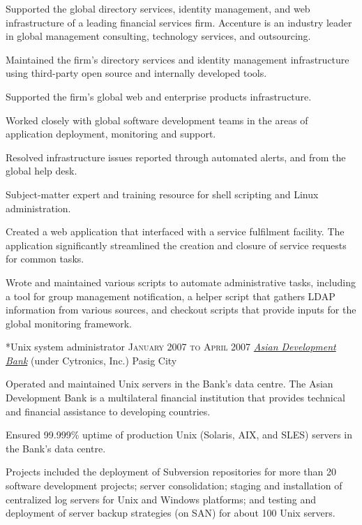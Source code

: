 \documentclass[10pt, a4paper, final]{article}
\begin{document}
\begin{section}
\begin{subsection}
    Supported the global directory services, identity management, and web infrastructure of a leading financial services firm. Accenture is an industry leader in global management consulting, technology services, and outsourcing.
    \vspace{1em}
    \begin{compactitem}
      \item Maintained the firm's directory services and identity management infrastructure using third-party open source and internally developed tools.
      \item Supported the firm's global web and enterprise products infrastructure.
      \item Worked closely with global software development teams in the areas of application deployment, monitoring and support.
      \item Resolved infrastructure issues reported through automated alerts, and from the global help desk.
      \item Subject-matter expert and training resource for shell scripting and Linux administration.
      \item Created a web application that interfaced with a service fulfilment facility. The application significantly streamlined the creation and closure of service requests for common tasks.
      \item Wrote and maintained various scripts to automate administrative tasks, including a tool for group management notification, a helper script that gathers LDAP information from various sources, and checkout scripts that provide inputs for the global monitoring framework.
      
    \end{compactitem}
  \end{subsection}
  \vspace{2.5em}

  \begin{subsection}*{Unix system administrator \hfill\textsc{January 2007 to April 2007}}
    \href{http://www.adb.org}{\textit{Asian Development Bank}} (under Cytronics, Inc.) \hfill Pasig City
    \vspace{1em}

    Operated and maintained Unix servers in the Bank's data centre. The Asian Development Bank is a multilateral financial institution that provides technical and financial assistance to developing countries.
    \vspace{1em}
    \begin{compactitem}
      \item Ensured 99.999\% uptime of production Unix (Solaris, AIX, and SLES) servers in the Bank's data centre.
      \item Projects included the deployment of Subversion repositories for more than 20 software development projects; server consolidation; staging and installation of centralized log servers for Unix and Windows platforms; and testing and deployment of server backup strategies (on SAN) for about 100 Unix servers.
      

\end{compactitem}
\end{subsection}
\end{section}
\end{document}
